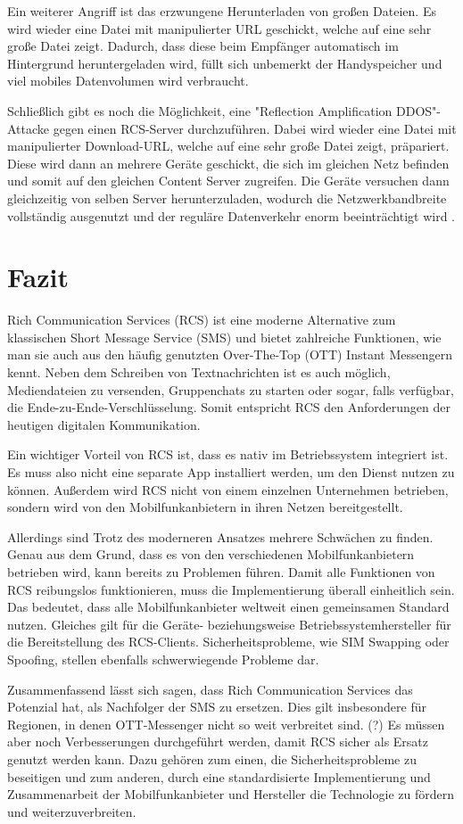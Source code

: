 \documentclass[conference]{IEEEtran}
\begin{document}
Ein weiterer Angriff ist das erzwungene Herunterladen von großen Dateien.
Es wird wieder eine Datei mit manipulierter URL geschickt, welche auf eine sehr große Datei zeigt.
Dadurch, dass diese beim Empfänger automatisch im Hintergrund heruntergeladen wird, füllt sich unbemerkt der Handyspeicher und viel mobiles Datenvolumen wird verbraucht.

Schließlich gibt es noch die Möglichkeit, eine "Reflection Amplification DDOS"-Attacke gegen einen RCS-Server durchzuführen.
Dabei wird wieder eine Datei mit manipulierter Download-URL, welche auf eine sehr große Datei zeigt, präpariert.
Diese wird dann an mehrere Geräte geschickt, die sich im gleichen Netz befinden und somit auf den gleichen Content Server zugreifen.
Die Geräte versuchen dann gleichzeitig von selben Server herunterzuladen, wodurch die Netzwerkbandbreite vollständig ausgenutzt und der reguläre Datenverkehr enorm beeinträchtigt wird \cite{uncoversec}.


\section{Fazit}

Rich Communication Services (RCS) ist eine moderne Alternative zum klassischen Short Message Service (SMS) und bietet zahlreiche Funktionen, wie man sie auch aus den häufig genutzten Over-The-Top (OTT) Instant Messengern kennt.
Neben dem Schreiben von Textnachrichten ist es auch möglich, Mediendateien zu versenden, Gruppenchats zu starten oder sogar, falls verfügbar, die Ende-zu-Ende-Verschlüsselung.
Somit entspricht RCS den Anforderungen der heutigen digitalen Kommunikation.

Ein wichtiger Vorteil von RCS ist, dass es nativ im Betriebssystem integriert ist.
Es muss also nicht eine separate App installiert werden, um den Dienst nutzen zu können.
Außerdem wird RCS nicht von einem einzelnen Unternehmen betrieben, sondern wird von den Mobilfunkanbietern in ihren Netzen bereitgestellt.

Allerdings sind Trotz des moderneren Ansatzes mehrere Schwächen zu finden.
Genau aus dem Grund, dass es von den verschiedenen Mobilfunkanbietern betrieben wird, kann bereits zu Problemen führen.
Damit alle Funktionen von RCS reibungslos funktionieren, muss die Implementierung überall einheitlich sein.
Das bedeutet, dass alle Mobilfunkanbieter weltweit einen gemeinsamen Standard nutzen.
Gleiches gilt für die Geräte- beziehungsweise Betriebssystemhersteller für die Bereitstellung des RCS-Clients.
Sicherheitsprobleme, wie SIM Swapping oder Spoofing, stellen ebenfalls schwerwiegende Probleme dar.

Zusammenfassend lässt sich sagen, dass Rich Communication Services das Potenzial hat, als Nachfolger der SMS zu ersetzen.
Dies gilt insbesondere für Regionen, in denen OTT-Messenger nicht so weit verbreitet sind. (?)
Es müssen aber noch Verbesserungen durchgeführt werden, damit RCS sicher als Ersatz genutzt werden kann.
Dazu gehören zum einen, die Sicherheitsprobleme zu beseitigen und zum anderen, durch eine standardisierte Implementierung und Zusammenarbeit der Mobilfunkanbieter und Hersteller die Technologie zu fördern und weiterzuverbreiten.



\end{document}
